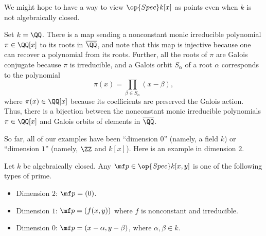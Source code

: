 \documentclass[../notes.tex]{subfiles}
\begin{document}
We might hope to have a way to view $\op{Spec}k[x]$ as points even when $k$ is not algebraically closed.
\begin{example}
	Set $k=\QQ$. There is a map sending a nonconstant monic irreducible polynomial $\pi\in\QQ[x]$ to its roots in $\overline\QQ$, and note that this map is injective because one can recover a polynomial from its roots. Further, all the roots of $\pi$ are Galois conjugate because $\pi$ is irreducible, and a Galois orbit $S_\alpha$ of a root $\alpha$ corresponds to the polynomial
	\[\pi(x)=\prod_{\beta\in S_\alpha}(x-\beta),\]
	where $\pi(x)\in\QQ[x]$ because its coefficients are preserved the Galois action. Thus, there is a bijection between the nonconstant monic irreducible polynomials $\pi\in\QQ[x]$ and Galois orbits of elements in $\overline\QQ$.
\end{example}
So far, all of our examples have been ``dimension $0$'' (namely, a field $k$) or ``dimension $1$'' (namely, $\ZZ$ and $k[x]$). Here is an example in dimension $2$.
\begin{exe} \label{exe:speckxy}
	Let $k$ be algebraically closed. Any $\mf p\in\op{Spec}k[x,y]$ is one of the following types of prime.
	\begin{itemize}
		\item Dimension $2$: $\mf p=(0)$.
		\item Dimension $1$: $\mf p=(f(x,y))$ where $f$ is nonconstant and irreducible.
		\item Dimension $0$: $\mf p=(x-\alpha,y-\beta)$, where $\alpha,\beta\in k$.
	\end{itemize}
\end{exe}
\end{document}
